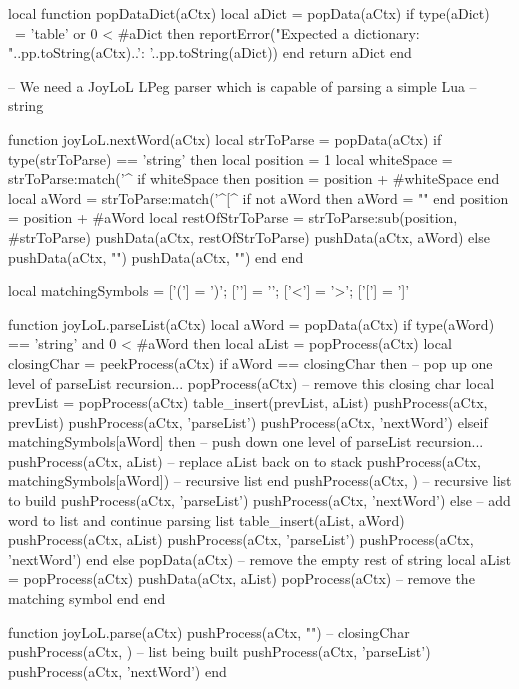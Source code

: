 local function popDataDict(aCtx)
  local aDict = popData(aCtx)
  if type(aDict) ~= 'table' or 0 < #aDict then
    reportError("Expected a dictionary\naCtx: "..pp.toString(aCtx)..'\naDict: '..pp.toString(aDict))
  end
  return aDict
end

-- We need a JoyLoL LPeg parser which is capable of parsing a simple Lua 
-- string 

function joyLoL.nextWord(aCtx)
  local strToParse = popData(aCtx)
  if type(strToParse) == 'string' then
    local position = 1
    local whiteSpace = strToParse:match('^%
    if whiteSpace then position = position + #whiteSpace end
    local aWord = strToParse:match('^[^%
    if not aWord then aWord = "" end
    position = position + #aWord
    local restOfStrToParse = strToParse:sub(position, #strToParse)
    pushData(aCtx, restOfStrToParse)
    pushData(aCtx, aWord)
  else
    pushData(aCtx, "")
    pushData(aCtx, "")
  end
end

local matchingSymbols = {
  ['('] = ')';
  ['{'] = '}';
  ['<'] = '>';
  ['['] = ']'
}

function joyLoL.parseList(aCtx)
  local aWord = popData(aCtx)
  if type(aWord) == 'string' and 0 < #aWord then
    local aList = popProcess(aCtx)
    local closingChar = peekProcess(aCtx)
    if aWord == closingChar then
      -- pop up one level of parseList recursion...
      popProcess(aCtx)       -- remove this closing char
      local prevList = popProcess(aCtx)
      table_insert(prevList, aList)
      pushProcess(aCtx, prevList)
      pushProcess(aCtx, 'parseList')
      pushProcess(aCtx, 'nextWord')
    elseif matchingSymbols[aWord] then
      -- push down one level of parseList recursion...
      pushProcess(aCtx, aList) -- replace aList back on to stack
      pushProcess(aCtx, matchingSymbols[aWord]) -- recursive list end
      pushProcess(aCtx, {})                     -- recursive list to build
      pushProcess(aCtx, 'parseList')
      pushProcess(aCtx, 'nextWord')
    else
      -- add word to list and continue parsing list
      table_insert(aList, aWord)
      pushProcess(aCtx, aList)
      pushProcess(aCtx, 'parseList')
      pushProcess(aCtx, 'nextWord')
    end
  else
    popData(aCtx) -- remove the empty rest of string
    local aList = popProcess(aCtx)
    pushData(aCtx, aList)
    popProcess(aCtx) -- remove the matching symbol
  end
end

function joyLoL.parse(aCtx)
  pushProcess(aCtx, "")  -- closingChar
  pushProcess(aCtx, {}) -- list being built
  pushProcess(aCtx, 'parseList')
  pushProcess(aCtx, 'nextWord')
end


